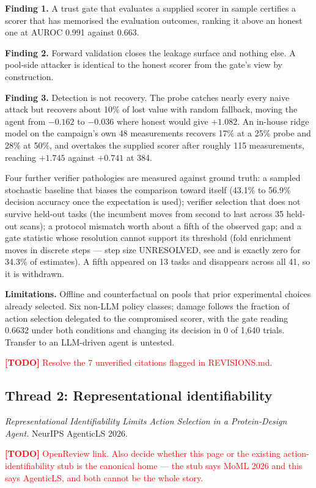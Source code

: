 \documentclass[11pt]{article}
\newcommand{\todo}[1]{\par\medskip\noindent\textcolor{red}{\textbf{[TODO]} #1}\par\medskip}
\newcommand{\finding}[2]{\par\medskip\noindent\textbf{Finding #1.} #2\par\medskip}
\begin{document}
\finding{1}{A trust gate that evaluates a supplied scorer in sample certifies a scorer that has memorised the
evaluation outcomes, ranking it above an honest one at AUROC 0.991 against 0.663.}

\finding{2}{Forward validation closes the leakage surface and nothing else. A pool-side attacker is identical
to the honest scorer from the gate's view by construction.}

\finding{3}{Detection is not recovery. The probe catches nearly every naive attack but recovers about 10\% of
lost value with random fallback, moving the agent from $-0.162$ to $-0.036$ where honest would give $+1.082$.
An in-house ridge model on the campaign's own 48 measurements recovers 17\% at a 25\% probe and 28\% at 50\%,
and overtakes the supplied scorer after roughly 115 measurements, reaching $+1.745$ against $+0.741$ at 384.}

Four further verifier pathologies are measured against ground truth: a sampled stochastic baseline that biases
the comparison toward itself (43.1\% to 56.9\% decision accuracy once the expectation is used); verifier
selection that does not survive held-out tasks (the incumbent moves from second to last across 35 held-out
scans); a protocol mismatch worth about a fifth of the observed gap; and a gate statistic whose resolution
cannot support its threshold (fold enrichment moves in discrete steps --- step size UNRESOLVED, see
and is exactly zero for 34.3\% of
estimates). A fifth appeared on 13 tasks and disappears across all 41, so it is withdrawn.

\textbf{Limitations.} Offline and counterfactual on pools that prior experimental choices already selected.
Six non-LLM policy classes; damage follows the fraction of action selection delegated to the compromised
scorer, with the gate reading 0.6632 under both conditions and changing its decision in 0 of 1{,}640 trials.
Transfer to an LLM-driven agent is untested. \todo{Resolve the 7 unverified citations flagged in REVISIONS.md.}

\subsection*{Thread 2: Representational identifiability}

\emph{Representational Identifiability Limits Action Selection in a Protein-Design Agent.}
NeurIPS AgenticLS 2026. \todo{OpenReview link. Also decide whether this page or the existing
action-identifiability stub is the canonical home --- the stub says MoML 2026 and this says AgenticLS, and both
cannot be the whole story.}
\end{document}
